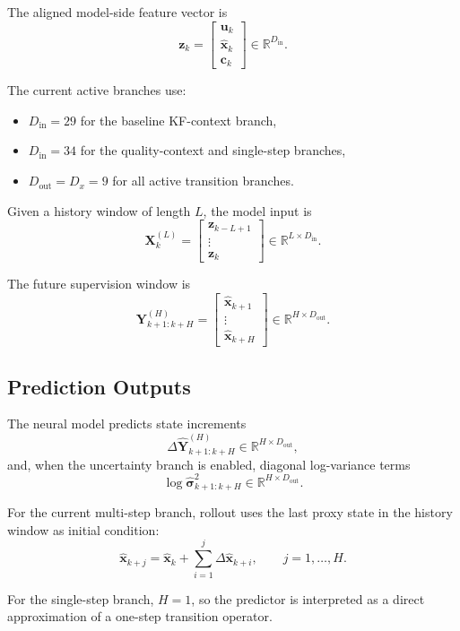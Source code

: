 The aligned model-side feature vector is
\begin{equation}
\mathbf{z}_k =
\begin{bmatrix}
\mathbf{u}_k \\
\hat{\mathbf{x}}_k \\
\mathbf{c}_k
\end{bmatrix}
\in \mathbb{R}^{D_{\mathrm{in}}}.
\end{equation}

The current active branches use:
\begin{itemize}
  \item $D_{\mathrm{in}} = 29$ for the baseline KF-context branch,
  \item $D_{\mathrm{in}} = 34$ for the quality-context and single-step branches,
  \item $D_{\mathrm{out}} = D_x = 9$ for all active transition branches.
\end{itemize}

Given a history window of length $L$, the model input is
\begin{equation}
\mathbf{X}^{(L)}_k =
\begin{bmatrix}
\mathbf{z}_{k-L+1} \\
\vdots \\
\mathbf{z}_k
\end{bmatrix}
\in \mathbb{R}^{L \times D_{\mathrm{in}}}.
\end{equation}

The future supervision window is
\begin{equation}
\mathbf{Y}^{(H)}_{k+1:k+H} =
\begin{bmatrix}
\hat{\mathbf{x}}_{k+1} \\
\vdots \\
\hat{\mathbf{x}}_{k+H}
\end{bmatrix}
\in \mathbb{R}^{H \times D_{\mathrm{out}}}.
\end{equation}

\subsection{Prediction Outputs}

The neural model predicts state increments
\begin{equation}
\Delta \hat{\mathbf{Y}}^{(H)}_{k+1:k+H}
\in \mathbb{R}^{H \times D_{\mathrm{out}}},
\end{equation}
and, when the uncertainty branch is enabled, diagonal log-variance terms
\begin{equation}
\log \hat{\boldsymbol{\sigma}}^2_{k+1:k+H}
\in \mathbb{R}^{H \times D_{\mathrm{out}}}.
\end{equation}

For the current multi-step branch, rollout uses the last proxy state in the history window as initial condition:
\begin{equation}
\hat{\mathbf{x}}_{k+j}
=
\hat{\mathbf{x}}_{k}
+
\sum_{i=1}^{j}\Delta \hat{\mathbf{x}}_{k+i},
\qquad j=1,\dots,H.
\end{equation}

For the single-step branch, $H=1$, so the predictor is interpreted as a direct approximation of a one-step transition operator.
